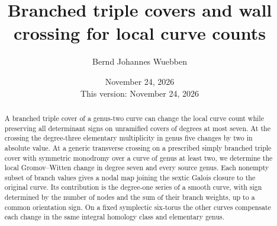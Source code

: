 \documentclass[11pt]{amsart}
\title[Branched triple covers and wall crossing]{Branched triple covers and wall crossing for local curve counts}
\author{Bernd Johannes Wuebben}
\date{November 24, 2026\\This version: November 24, 2026}
\theoremstyle{definition}
\theoremstyle{remark}
\begin{document}
\begin{abstract}
A branched triple cover of a genus-two curve can change the local
curve count while preserving all determinant signs on unramified covers
of degrees at most seven. At the crossing the degree-three elementary
multiplicity in genus five changes by two in absolute value. At a generic
transverse crossing on a prescribed simply branched triple cover with
symmetric monodromy over a curve of genus at least two, we determine
the local Gromov--Witten change in degree seven and every source genus. Each nonempty subset of
branch values gives a nodal map joining the sextic Galois closure to the
original curve. Its contribution is the degree-one series of a smooth
curve, with sign determined by the number of nodes and the sum of
their branch weights, up to a common orientation sign. On a fixed
symplectic six-torus the other curves compensate each change in the
same integral homology class and elementary genus.
\end{abstract}
\maketitle
\newpage
\tableofcontents
\newpage










\appendix






\end{document}
